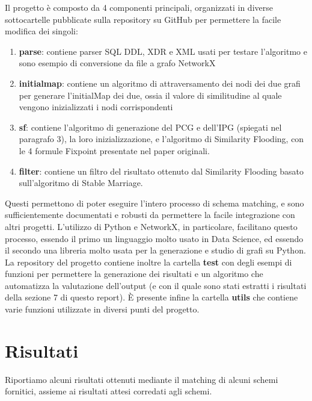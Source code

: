 \documentclass{article}
\begin{document}
Il progetto è composto da 4 componenti principali, organizzati in diverse sottocartelle pubblicate sulla repository su GitHub per permettere la facile modifica dei singoli:
\begin{enumerate}
	\item \textbf{parse}: contiene parser SQL DDL, XDR e XML usati per testare l'algoritmo e sono esempio di conversione da file a grafo NetworkX
	\item \textbf{initialmap}: contiene un algoritmo di attraversamento dei nodi dei due grafi per generare l'initialMap dei due, ossia il valore di similitudine al quale vengono inizializzati i nodi corrispondenti
	\item \textbf{sf}: contiene l'algoritmo di generazione del PCG e dell'IPG (spiegati nel paragrafo 3), la loro inizializzazione, e l'algoritmo di Similarity Flooding, con le 4 formule Fixpoint presentate nel paper originali. 
	\item \textbf{filter}: contiene un filtro del risultato ottenuto dal Similarity Flooding basato sull'algoritmo di Stable Marriage.
\end{enumerate}
Questi permettono di poter eseguire l'intero processo di schema matching, e sono sufficientemente documentati e robusti da permettere la facile integrazione con altri progetti. L'utilizzo di Python e NetworkX, in particolare, facilitano questo processo, essendo il primo un linguaggio molto usato in Data Science, ed essendo il secondo una libreria molto usata per la generazione e studio di grafi su Python.\\

La repository del progetto contiene inoltre la cartella \textbf{test} con degli esempi di funzioni per permettere la generazione dei risultati e un algoritmo che automatizza la valutazione dell'output (e con il quale sono stati estratti i risultati della sezione 7 di questo report). È presente infine la cartella \textbf{utils} che contiene varie funzioni utilizzate in diversi punti del progetto.


\section{Risultati}

Riportiamo alcuni risultati ottenuti mediante il matching di alcuni schemi fornitici, assieme ai risultati attesi corredati agli schemi.\\
\end{document}
